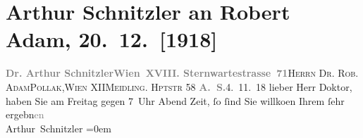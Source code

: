 

         
         \renewcommand{\erwaehntePersonen}{Personen: Robert Adam}
         \renewcommand{\erwaehnteOrte}{Orte: Meidlinger Hauptstraße, Sternwartestraße, Wien, XII., Meidling}
         \renewcommand{\erwaehnteWerke}{}
               \section[Arthur Schnitzler an Robert Adam, 20. 12. {[}1918{]}]{ Arthur Schnitzler an Robert Adam, 20. 12. {[}1918{]}}\nopagebreak{}\rehead{ }\begin{ledgroupsized}[t]{13cm}\normalsize\beginnumbering \toendnotes[C]{\smallbreak\pagebreak[2]} 
\pstart{}{\pb}\textcolor{gray}{\textbf{Dr. Arthur Schnitzler}}\pend{}\pstart{}\textcolor{gray}{\textbf{Wien XVIII. Sternwartestrasse 71}}\pend{}{\bigskip}\pstart{}\textsc{Herrn Dr. Rob. Adam}\pend{}\pstart{}\textsc{Pollak},\pend{}\pstart{}\textsc{Wien} XII\pend{}\pstart{}\textsc{Meidling. Hptstr} 58\pend{}{\bigskip}\pstart
           {\pb}\textcolor{gray}{\textbf{A. S.}}\hfill 4. 11. 18\pend
           \pstart{}lieber Herr Doktor,\pend\pstart
           haben Sie am Freitag gegen 7 Uhr Abend Zeit, ſo ſind
                    Sie willko{\geminationm}en\pend
           \pstart
           Ihrem ſehr ergebn\textcolor{gray}{en}{\\[\baselineskip]}\spacefill\mbox{Arthur Schnitzler}\pend
           \leftskip=0em{}
         
         \endnumbering{}\end{ledgroupsized}  \newcommand{\dateiname}{L02316}\newcommand{\titel}{Arthur Schnitzler an Robert Adam, 20. 12. [1918]}\newcommand{\editorInnen}{Martin Anton Müller und Gerd-Hermann Susen}
      